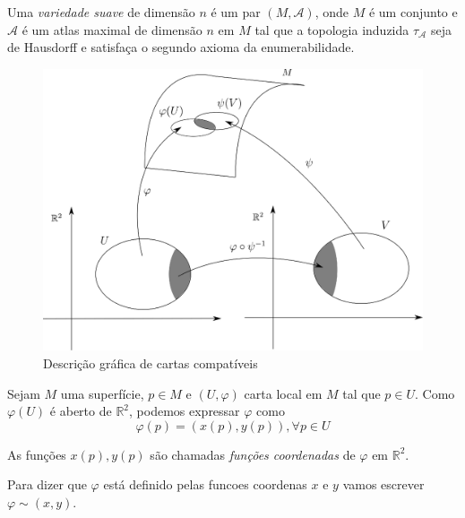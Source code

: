 \begin{defi}
	Uma \emph{variedade suave} de dimensão $n$ é um par $(M, \mathcal{A})$, onde $M$ é um conjunto e $\mathcal{A}$ é um atlas maximal de dimensão $n$ em $M$ tal que a topologia induzida $\tau_{\mathcal{A}}$ seja de Hausdorff e satisfaça o segundo axioma da enumerabilidade.
\end{defi}

\begin{figure}
	\centering
	\includegraphics[scale=0.5]{graficos/cartas_compativeis.eps}
	\caption{Descrição gráfica de cartas compatíveis}
\end{figure}

Sejam $M$ uma superfície, $p \in M$ e $(U, \varphi)$ carta local em $M$ tal que $p \in U$. Como $\varphi(U)$ é aberto de $\mathbb{R}^2$, podemos expressar $\varphi$ como
\begin{equation*}
	\varphi(p) = (x(p), y(p)), \forall p \in U
\end{equation*}

As funções $x(p), y(p)$ são chamadas \emph{funções coordenadas} de $\varphi$ em $\mathbb{R}^2$.

\begin{nota}
	Para dizer que $\varphi$ está definido pelas funcoes coordenas $x$ e $y$ vamos escrever $\varphi \sim  (x,y)$.
\end{nota}

